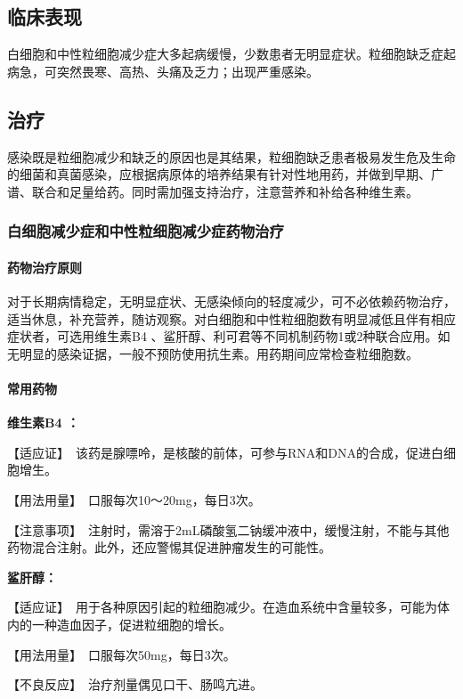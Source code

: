 \subsection{临床表现}

白细胞和中性粒细胞减少症大多起病缓慢，少数患者无明显症状。粒细胞缺乏症起病急，可突然畏寒、高热、头痛及乏力；出现严重感染。

\subsection{治疗}

感染既是粒细胞减少和缺乏的原因也是其结果，粒细胞缺乏患者极易发生危及生命的细菌和真菌感染，应根据病原体的培养结果有针对性地用药，并做到早期、广谱、联合和足量给药。同时需加强支持治疗，注意营养和补给各种维生素。

\subsubsection{白细胞减少症和中性粒细胞减少症药物治疗}
\paragraph{药物治疗原则}

对于长期病情稳定，无明显症状、无感染倾向的轻度减少，可不必依赖药物治疗，适当休息，补充营养，随访观察。对白细胞和中性粒细胞数有明显减低且伴有相应症状者，可选用维生素B{4}
、鲨肝醇、利可君等不同机制药物1或2种联合应用。如无明显的感染证据，一般不预防使用抗生素。用药期间应常检查粒细胞数。
\paragraph{常用药物}

\textbf{维生素B{4} ：}

【适应证】　该药是腺嘌呤，是核酸的前体，可参与RNA和DNA的合成，促进白细胞增生。

【用法用量】　口服每次10～20mg，每日3次。

【注意事项】　注射时，需溶于2mL磷酸氢二钠缓冲液中，缓慢注射，不能与其他药物混合注射。此外，还应警惕其促进肿瘤发生的可能性。

\textbf{鲨肝醇：}

【适应证】　用于各种原因引起的粒细胞减少。在造血系统中含量较多，可能为体内的一种造血因子，促进粒细胞的增长。

【用法用量】　口服每次50mg，每日3次。

【不良反应】　治疗剂量偶见口干、肠鸣亢进。


